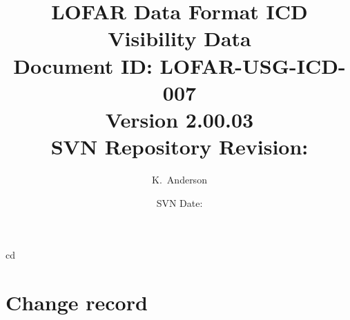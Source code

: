 \documentclass[a4paper,10pt,bibtotoc]{scrartcl}
\begin{document}
cd 
\title{LOFAR Data Format ICD \\ Visibility Data \\
{\normalsize Document ID: LOFAR-USG-ICD-007} \\ 
{\normalsize Version 2.00.03} \\
{\normalsize SVN Repository Revision: \svnInfoMaxRevision}}
\author{K.~Anderson}
\date{\small{SVN Date: \svnInfoMaxToday}}
\maketitle

\tableofcontents

\clearpage


\section*{Change record}
\end{document}
